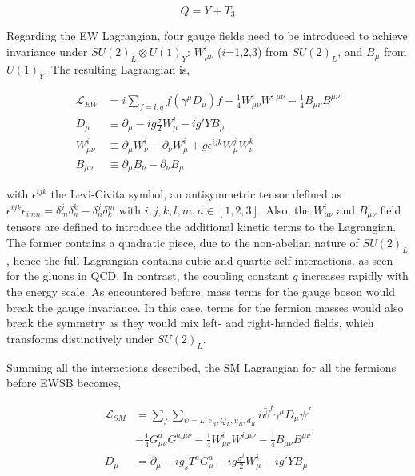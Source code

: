 \begin{equation}
Q = Y+T_3
\end{equation}

Regarding the \acrshort{EW} Lagrangian, four gauge fields need to be introduced to achieve invariance under $SU(2)_L\otimes U(1)_Y$: $W_{\mu\nu}^i$ ($i$=1,2,3) from $SU(2)_L$, and $B_\mu$ from $U(1)_Y$. The resulting Lagrangian is,

\begin{equation}
\label{Theory_eq:EWlagrangian}
\begin{split}
    \mathcal{L}_{EW}&=i\sum_{f=l,q}\bar{f}(\gamma^\mu D_\mu)f - \frac{1}{4}W_{\mu\nu}^iW^{i\ \mu\nu} - \frac{1}{4}B_{\mu\nu}B^{\mu\nu}\\
    D_{\mu \ } &\equiv \partial_\mu - ig\frac{\sigma}{2}W_\mu^i-ig'YB_\mu \\
    W_{\mu\nu}^i &\equiv \partial_\mu W_\nu^i - \partial_\nu W_\mu^i +g\epsilon^{ijk}W_\mu^j W_\nu^k\\
    B_{\mu\nu}&\equiv\partial_\mu B_\nu - \partial_\nu B_\mu
    \end{split}
\end{equation}

with $\epsilon^{ijk}$ the Levi-Civita symbol, an antisymmetric tensor defined as $\epsilon^{ijk}\epsilon_{imn}=\delta^j_m\delta^k_n-\delta^j_n\delta^m_k$ with $i,j,k,l,m,n\in[1,2,3]$. Also, the $W_{\mu\nu}^i$ and $B_{\mu\nu}$ field tensors are defined to introduce the additional kinetic terms to the Lagrangian. The former contains a quadratic piece, due to the non-abelian nature of $SU(2)_L$, hence the full Lagrangian contains cubic and quartic self-interactions, as seen for the gluons in QCD. In contrast, the coupling constant $g$ increases rapidly with the energy scale. As encountered before, mass terms for the gauge boson would break the gauge invariance. In this case, terms for the fermion masses would also break the symmetry as they would mix left- and right-handed fields, which transforms distinctively under $SU(2)_L$.

Summing all the interactions described, the SM Lagrangian for all the fermions before \acrshort{EWSB} becomes,

\begin{equation}
    \label{Theory_eq:SMbeforeEWSB}
    \begin{split}
    \mathcal{L}_{SM} &= \sum_f\sum_{\psi=L,e_R,Q_L,u_R,d_R} i\bar{\psi}^f\gamma^\mu D_\mu \psi^f\\
    &- \frac{1}{4}G^a_{\mu\nu}G^{a\_\mu\nu} - \frac{1}{4}W^i_{\mu\nu}W^{i\_\mu\nu} - \frac{1}{4}B_{\mu\nu}B^{\mu\nu}\\
    D_\mu &= \partial_\mu - i g_s T^a G^a_\mu - i g \frac{\sigma^i}{2}W_\mu^i - ig'YB_\mu 
    \end{split}
\end{equation}

